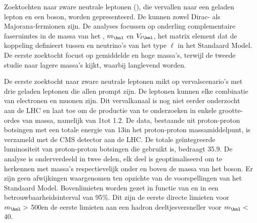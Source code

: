 
\begin{extraAbstract}

Zoektochten naar zware neutrale leptonen (\hnl), die vervallen naar een geladen lepton en een \PW boson, worden gepresenteerd.
De \hnl kunnen zowel Dirac- als Majorana-fermionen zijn. De analyses focussen op onderling complementaire faseruimtes in de massa van het \hnl,
$m_\hnl$ en $V_{\ell \hnl}$, het matrix element dat de koppeling definieert tussen \hnl en neutrino's van het type $\ell$ in het Standaard Model.
De eerste zoektocht focust op gemiddelde en hoge massa's, terwijl de tweede studie naar lagere massa's kijkt, waarbij \hnl langlevend worden.

De eerste zoektocht naar zware neutrale leptonen mikt op vervalscenario's met drie geladen leptonen die allen prompt zijn.
De leptonen kunnen elke combinatie van electronen en muonen zijn. Dit vervalkanaal is nog niet eerder onderzocht aan de LHC
en laat toe om de productie van \hnl te onderzoeken in enkele grootte-ordes van \hnl massa, namelijk van 1\GeV tot 1.2\TeV.
De data, bestaande uit proton-proton botsingen met een totale energie van 13\TeV in het proton-proton massamiddelpunt, is verzameld met de CMS detector aan de LHC.
De totale ge\"integreerde luminositeit van proton-proton botsingen die gebruikt is, bedraagt 35.9\fbinv.
De analyse is onderverdeeld in twee delen, elk deel is geoptimaliseerd om \hnl te herkennen met massa's respectievelijk onder en boven de massa van het \PW boson.
Er zijn geen afwijkingen waargenomen ten opzichte van de voorspellingen van het Standaard Model.
Bovenlimieten worden gezet in functie van \mixparm en \mixpare in een betrouwbaarheidsinterval van 95\%.
Dit zijn de eerste directe limieten voor $m_\hnl >$ 500\GeV en de eerste limieten aan een hadron deeltjesversneller voor $m_\hnl <$ 40\GeV.


\end{extraAbstract}
